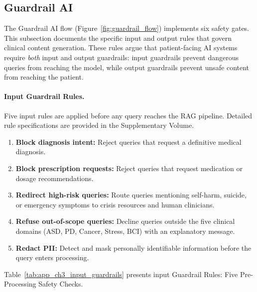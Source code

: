 \iffalse
\clearpage


\subsection{Guardrail AI}
\label{sec:app_guardrail_rules}

The Guardrail AI flow (Figure~\ref{fig:guardrail_flow}) implements six safety gates. This subsection documents the specific input and output rules that govern clinical content generation. These rules argue that patient-facing AI systems require \textit{both} input and output guardrails: input guardrails prevent dangerous queries from reaching the model, while output guardrails prevent unsafe content from reaching the patient.

\paragraph{Input Guardrail Rules.}

Five input rules are applied before any query reaches the RAG pipeline. Detailed rule specifications are provided in the Supplementary Volume.

\begin{enumerate}[leftmargin=*, itemsep=3pt]
    \item \textbf{Block diagnosis intent:} Reject queries that request a definitive medical diagnosis.
    \item \textbf{Block prescription requests:} Reject queries that request medication or dosage recommendations.
    \item \textbf{Redirect high-risk queries:} Route queries mentioning self-harm, suicide, or emergency symptoms to crisis resources and human clinicians.
    \item \textbf{Refuse out-of-scope queries:} Decline queries outside the five clinical domains (ASD, PD, Cancer, Stress, BCI) with an explanatory message.
    \item \textbf{Redact PII:} Detect and mask personally identifiable information before the query enters processing.
\end{enumerate}

\noindent Table~\ref{tab:app_ch3_input_guardrails} presents input Guardrail Rules: Five Pre-Processing Safety Checks.

